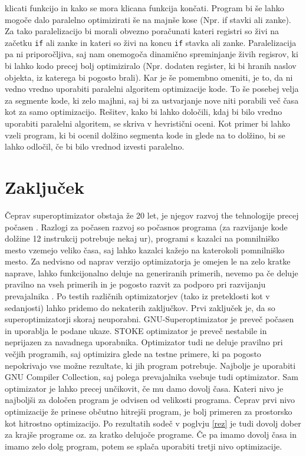 \documentclass[a4paper, 12pt]{book}
\begin{document}
klicati funkcijo in kako se mora klicana funkcija končati. Program bi še lahko mogoče dalo paralelno optimizirati še na majnše kose (Npr. if stavki ali zanke). Za tako paralelizacijo bi morali obvezno poračunati kateri registri so živi na začetku \texttt{if} ali zanke in kateri so živi na koncu \texttt{if} stavka ali zanke. Paralelizacija pa ni priporočljiva, saj nam onemogoča dinamično spreminjanje živih regisrov, ki bi lahko kodo precej bolj optimiziralo (Npr. dodaten register, ki bi hranih naslov objekta, iz katerega bi pogosto brali). Kar je še pomembno omeniti, je to, da ni vedno vredno uporabiti paralelni algoritem optimizacije kode. To še posebej velja za segmente kode, ki zelo majhni, saj bi za ustvarjanje nove niti porabili več časa kot za samo optimizacijo. Rešitev, kako bi lahko določili, kdaj bi bilo vredno uporabiti paralelni algoritem, se skriva v hevristični oceni. Kot primer bi lahko vzeli program, ki bi ocenil dolžino segmenta kode in glede na to dolžino, bi se lahko odločil, če bi bilo vrednod izvesti paralelno.

\chapter{Zaključek}

Čeprav superoptimizator obstaja že 20 let, je njegov razvoj the tehnologije precej počasen \cite{pdf4}. Razlogi za počasen razvoj so počasnos programa (za razvijanje kode dolžine 12 instrukcij potrebuje nekaj ur), programi s kazalci na pomnilniško mesto vzemejo veliko časa, saj lahko kazalci kažejo na katerokoli pomnilniško mesto. Za nedvisno od naprav verzijo optimizatorja je omejen le na zelo kratke naprave, lahko funkcijonalno deluje na generiranih primerih, nevemo pa če deluje pravilno na vseh primerih in je pogosto razvit za podporo pri razvijanju prevajalnika \cite{razlog}. Po testih različnih optimizatorjev (tako iz preteklosti kot v sedanjosti) lahko pridemo do nekaterih zaključkov. Prvi zaključek je, da so superoptimizatorji skoraj neuporabni. GNU-Superoptimizator je preveč počasen in uporablja le podane ukaze. STOKE optimizator je preveč nestabile in neprijazen za navadnega uporabnika. Optimizator tudi ne deluje pravilno pri večjih programih, saj optimizira glede na testne primere, ki pa pogosto nepokrivajo vse možne rezultate, ki jih program potrebuje. Najbolje je uporabiti GNU Compiler Collection, saj polega prevajalnika vsebuje tudi optimizator. Sam optimizator je lahko precej unčikovit, če mu damo dovolj časa. Kateri nivo je najboljši za določen program je odvisen od velikosti programa. Čeprav prvi nivo optimizacije že prinese občutno hitrejši program, je bolj primeren za prostorsko kot hitrostno optimizacijo. Po rezultatih sodeč v poglvju \ref{rez} je tudi dovolj dober za krajše programe oz. za kratko delujoče programe. Če pa imamo dovolj časa in imamo zelo dolg program, potem se splača uporabiti tretji nivo optimizacije. \cite{pdf6}
\ \\
\newpage

\clearpage  
{}


\end{document}
